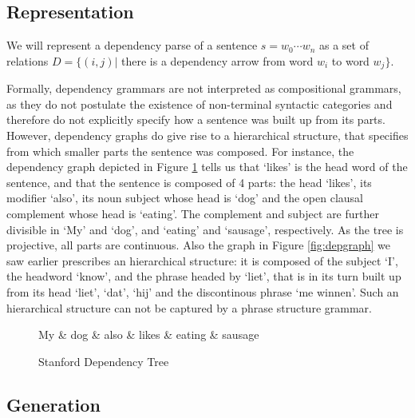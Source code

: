 \subsection{Representation}

We will represent a dependency parse of a sentence $s = w_0\cdots w_n$ as a set of relations $D = \{(i,j)|$ there is a dependency arrow from word $w_i$ to word $w_j \}$. 

Formally, dependency grammars are not interpreted as compositional grammars, as they do not postulate the existence of non-terminal syntactic categories and therefore do not explicitly specify how a sentence was built up from its parts. However, dependency graphs do give rise to a hierarchical structure, that specifies from which smaller parts the sentence was composed. For instance, the dependency graph depicted in Figure \ref{fig:deptree} tells us that `likes' is the head word of the sentence, and that the sentence is composed of 4 parts: the head `likes', its modifier `also', its noun subject whose head is `dog' and the open clausal complement whose head is `eating'. The complement and subject are further divisible in `My' and `dog', and `eating' and `sausage', respectively. As the tree is projective, all parts are continuous. Also the graph in Figure \ref{fig:depgraph} we saw earlier prescribes an hierarchical structure: it is composed of the subject `I', the headword `know', and the phrase headed by `liet', that is in its turn built up from its head `liet', `dat', `hij' and the discontinous phrase `me winnen'. Such an hierarchical structure can not be captured by a phrase structure grammar.

\begin{figure}[!h]\label{fig:deptree1}
\centering
\begin{dependency}[theme=simple]%
\begin{deptext}[column sep=.5cm, row sep=.1ex]
My \& dog \& also \& likes \& eating \& sausage \\
\end{deptext}
\end{dependency}
\caption{Stanford Dependency Tree}\label{fig:deptree}
\end{figure}

\subsection{Generation}

